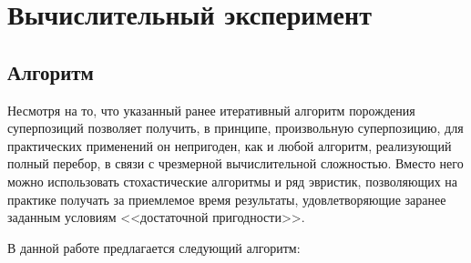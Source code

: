 \documentclass[12pt,a4paper]{amsart}
\begin{document}
\section{Вычислительный эксперимент}

\subsection{Алгоритм}

Несмотря на то, что указанный ранее итеративный алгоритм порождения
суперпозиций позволяет получить, в принципе, произвольную суперпозицию,
для практических применений он непригоден, как и любой алгоритм, реализующий
полный перебор, в связи с чрезмерной вычислительной сложностью. Вместо него
можно использовать стохастические алгоритмы и ряд эвристик, позволяющих на
практике получать за приемлемое время результаты, удовлетворяющие заранее
заданным условиям <<достаточной пригодности>>.

В данной работе предлагается следующий алгоритм:
\end{document}
